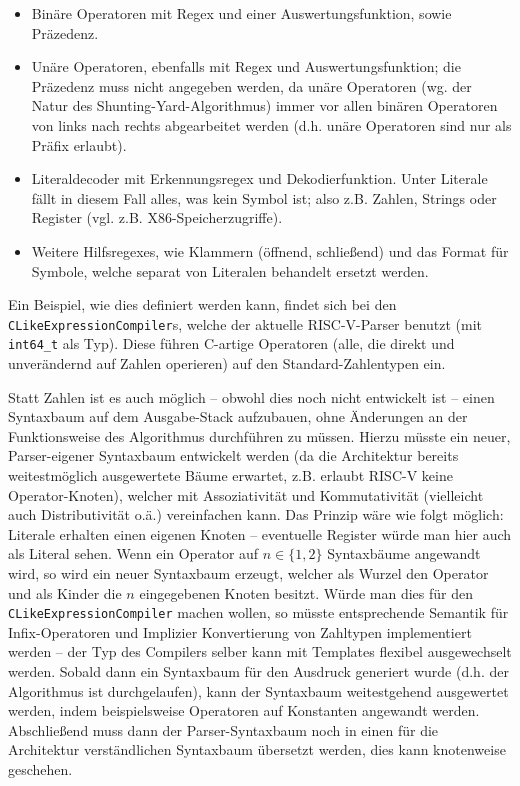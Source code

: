 \begin{itemize}
  \item Binäre Operatoren mit Regex und einer Auswertungsfunktion, sowie
  Präzedenz.

  \item Unäre Operatoren, ebenfalls mit Regex und Auswertungsfunktion; die
  Präzedenz muss nicht angegeben werden, da unäre Operatoren (wg. der Natur des
  Shunting-Yard-Algorithmus) immer vor allen binären Operatoren von links nach
  rechts abgearbeitet werden (d.h. unäre Operatoren sind nur als Präfix
  erlaubt).

  \item Literaldecoder mit Erkennungsregex und Dekodierfunktion. Unter Literale
  fällt in diesem Fall alles, was kein Symbol ist; also z.B. Zahlen, Strings
  oder Register (vgl. z.B. X86-Speicherzugriffe).

  \item Weitere Hilfsregexes, wie Klammern (öffnend, schließend) und das Format
  für Symbole, welche separat von Literalen behandelt ersetzt werden.

\end{itemize}

Ein Beispiel, wie dies definiert werden kann, findet sich bei den
\texttt{CLikeExpressionCompiler}s, welche der aktuelle RISC-V-Parser benutzt
(mit \texttt{int64\_t} als Typ). Diese führen C-artige Operatoren (alle, die
direkt und unverändernd auf Zahlen operieren) auf den Standard-Zahlentypen ein.

Statt Zahlen ist es auch möglich – obwohl dies noch nicht entwickelt ist – einen
Syntaxbaum auf dem Ausgabe-Stack aufzubauen, ohne Änderungen an der
Funktionsweise des Algorithmus durchführen zu müssen. Hierzu müsste ein neuer,
Parser-eigener Syntaxbaum entwickelt werden (da die Architektur bereits
weitestmöglich ausgewertete Bäume erwartet, z.B. erlaubt RISC-V keine
Operator-Knoten), welcher mit Assoziativität und Kommutativität (vielleicht auch
Distributivität o.ä.) vereinfachen kann. Das Prinzip wäre wie folgt möglich:
Literale erhalten einen eigenen Knoten – eventuelle Register würde man hier auch
als Literal sehen. Wenn ein Operator auf $n\in\{1,2\}$ Syntaxbäume angewandt
wird, so wird ein neuer Syntaxbaum erzeugt, welcher als Wurzel den Operator und
als Kinder die $n$ eingegebenen Knoten besitzt. Würde man dies für den
\texttt{CLikeExpressionCompiler} machen wollen, so müsste entsprechende Semantik
für Infix-Operatoren und Implizier Konvertierung von Zahltypen implementiert
werden – der Typ des Compilers selber kann mit Templates flexibel ausgewechselt
werden. Sobald dann ein Syntaxbaum für den Ausdruck generiert wurde (d.h. der
Algorithmus ist durchgelaufen), kann der Syntaxbaum weitestgehend ausgewertet
werden, indem beispielsweise Operatoren auf Konstanten angewandt werden.
Abschließend muss dann der Parser-Syntaxbaum noch in einen für die Architektur
verständlichen Syntaxbaum übersetzt werden, dies kann knotenweise geschehen.

